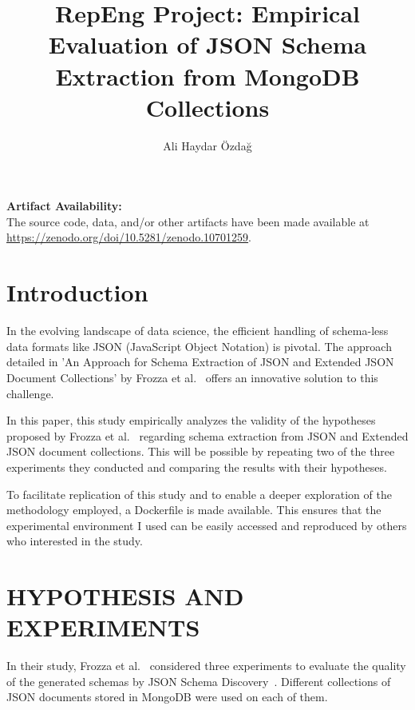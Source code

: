 \documentclass[sigconf, nonacm]{acmart}
\begin{document}
\title{RepEng Project:  Empirical Evaluation of JSON Schema Extraction from MongoDB Collections}


\author{Ali Haydar Özdağ}


\maketitle

\vspace{.3cm}
\begingroup\small\noindent\raggedright\textbf{Artifact Availability:}\\
The source code, data, and/or other artifacts have been made available at \url{https://zenodo.org/doi/10.5281/zenodo.10701259}.
\endgroup


\section{Introduction}

In the evolving landscape of data science, the efficient handling of schema-less data formats like JSON (JavaScript Object Notation) is pivotal. The approach detailed in 'An Approach for Schema Extraction of JSON and Extended JSON Document Collections' by Frozza et al.~\cite{SchemaExtraction} offers an innovative solution to this challenge.

In this paper, this study empirically analyzes the validity of the hypotheses proposed by Frozza et al.~\cite{SchemaExtraction} regarding schema extraction from JSON and Extended JSON document collections. This will be possible by repeating two of the three experiments they conducted and comparing the results with their hypotheses.

To facilitate replication of this study and to enable a deeper exploration of the methodology employed, a Dockerfile is made available. This ensures that the experimental environment I used can be easily accessed and reproduced by others who interested in the study.

\section{HYPOTHESIS AND EXPERIMENTS}

In their study, Frozza et al.~\cite{SchemaExtraction} considered three experiments to evaluate the quality of the generated schemas by JSON Schema Discovery~\cite{JSONSchemaDiscovery}.  Different collections of JSON documents stored in MongoDB were used on each of them.
\end{document}
